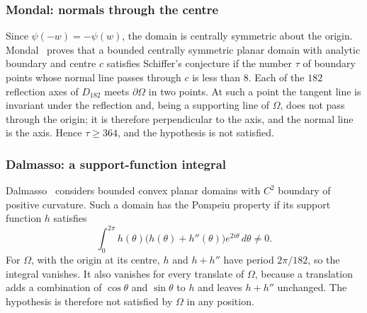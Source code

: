 \subsubsection{Mondal: normals through the centre}
Since $\psi(-w)=-\psi(w)$, the domain is centrally symmetric about the origin. Mondal~\cite{Mon26} proves that a bounded centrally symmetric planar domain with analytic boundary and centre $c$ satisfies Schiffer's conjecture if the number $\tau$ of boundary points whose normal line passes through $c$ is less than $8$. Each of the $182$ reflection axes of $D_{182}$ meets $\partial\Omega$ in two points. At such a point the tangent line is invariant under the reflection and, being a supporting line of $\Omega$, does not pass through the origin; it is therefore perpendicular to the axis, and the normal line is the axis. Hence $\tau\ge364$, and the hypothesis is not satisfied.

\subsubsection{Dalmasso: a support-function integral}
Dalmasso~\cite[Theorem~4]{Dal00} considers bounded convex planar domains with $C^2$ boundary of positive curvature. Such a domain has the Pompeiu property if its support function $h$ satisfies
\[
 \int_0^{2\pi}h(\theta)\bigl(h(\theta)+h''(\theta)\bigr)e^{2i\theta}\,d\theta\ne0.
\]
For $\Omega$, with the origin at its centre, $h$ and $h+h''$ have period $2\pi/182$, so the integral vanishes. It also vanishes for every translate of $\Omega$, because a translation adds a combination of $\cos\theta$ and $\sin\theta$ to $h$ and leaves $h+h''$ unchanged. The hypothesis is therefore not satisfied by $\Omega$ in any position.


